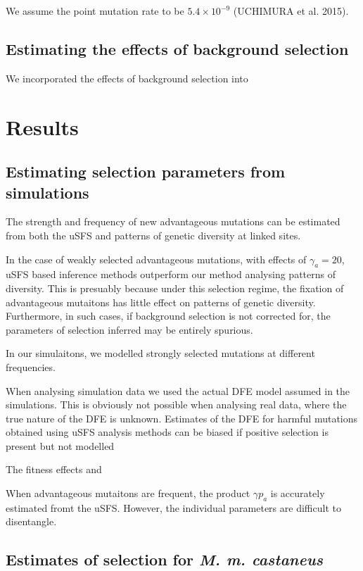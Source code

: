 \documentclass[11pt]{article}
\begin{document}
	We assume the point mutation rate to be $5.4 \times 10^{-9}$ (UCHIMURA et al. 2015).
 	
 	
\subsection*{Estimating the effects of background selection}

We incorporated the effects of background selection into 

\section*{Results}
\subsection*{Estimating selection parameters from simulations}

	The strength and frequency of new advantageous mutations can be  estimated from both the uSFS and patterns of genetic diversity at linked sites. 
	
	In the case of weakly selected advantageous mutations, with effects of $\gamma_a = 20$, uSFS based inference methods outperform our method analysing patterns of diversity. This is presuably because under this selection regime, the fixation of advantageous mutaitons has little effect on patterns of genetic diversity. Furthermore, in such cases, if background selection is not corrected for, the parameters of selection inferred may be entirely spurious.
	
	In our simulaitons, we modelled strongly selected mutations at different frequencies. 
	
	When analysing simulation data we used the actual DFE model assumed in the simulations. This is obviously not possible when analysing real data, where the true nature of the DFE is unknown. Estimates of the DFE for harmful mutations obtained using uSFS analysis methods can be biased if positive selection is present but not modelled 
	
The fitness effects and 

When advantageous mutaitons are frequent, the product $\gamma p_a$ is accurately estimated fromt the uSFS. However, the individual parameters are difficult to disentangle. 
	
	
\subsection*{Estimates of selection for \textit{M. m. castaneus}}
\end{document}
